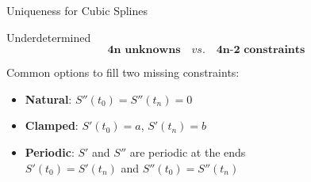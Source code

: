 \documentclass[10pt]{beamer}
\begin{document}
\begin{frame}{Uniqueness for Cubic Splines}

\begin{block}{Underdetermined}
$$\textbf{4n unknowns}\quad vs.\quad \textbf{4n-2 constraints}$$
\end{block}

Common options to fill two missing constraints:\\[3mm]
  \begin{itemize}
    \item \textbf{Natural}: $S''(t_0)=S''(t_n)=0$ \bigskip 
    \item \textbf{Clamped}: $S'(t_0)=a$, $S'(t_n)=b$ \bigskip
    \item \textbf{Periodic}: $S'$ and $S''$ are periodic at the ends\\
       $S'(t_0) = S'(t_n)$ and $S''(t_0) = S''(t_n)$
  \end{itemize}
\vspace{4mm}

\end{frame}




\end{document}
